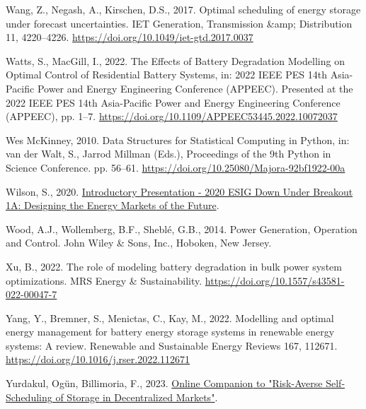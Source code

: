 \documentclass[12pt,a4paper,]{report}
\newlength{\cslhangindent}
\newenvironment{CSLReferences}[2] %
 {%
  \setlength{\parindent}{0pt}
  \ifodd #1 \everypar{\setlength{\hangindent}{\cslhangindent}}\ignorespaces\fi
  \ifnum #2 > 0
  \setlength{\parskip}{#2\baselineskip}
  \fi
 }%
 {}
\begin{document}
\begin{CSLReferences}{1}{0}
\leavevmode{}%
Wang, Z., Negash, A., Kirschen, D.S., 2017. Optimal scheduling of energy
storage under forecast uncertainties. IET Generation, Transmission
\&amp; Distribution 11, 4220--4226.
\url{https://doi.org/10.1049/iet-gtd.2017.0037}

\leavevmode{}%
Watts, S., MacGill, I., 2022. The {Effects} of {Battery Degradation
Modelling} on {Optimal Control} of {Residential Battery Systems}, in:
2022 {IEEE PES} 14th {Asia-Pacific Power} and {Energy Engineering
Conference} ({APPEEC}). Presented at the 2022 {IEEE PES} 14th
{Asia-Pacific Power} and {Energy Engineering Conference} ({APPEEC}), pp.
1--7. \url{https://doi.org/10.1109/APPEEC53445.2022.10072037}

\leavevmode{}%
Wes McKinney, 2010. Data {Structures} for {Statistical Computing} in
{Python}, in: van der Walt, S., Jarrod Millman (Eds.), Proceedings of
the 9th {Python} in {Science Conference}. pp. 56--61.
\url{https://doi.org/10.25080/Majora-92bf1922-00a}

\leavevmode{}%
Wilson, S., 2020.
\href{https://www.youtube.com/watch?v=LpYnKVC9hGY&feature=youtu.be}{Introductory
{Presentation} - 2020 {ESIG Down Under Breakout 1A}: {Designing} the
{Energy Markets} of the {Future}}.

\leavevmode{}%
Wood, A.J., Wollemberg, B.F., Sheblé, G.B., 2014. Power {Generation},
{Operation} and {Control}. {John Wiley \& Sons, Inc.}, {Hoboken, New
Jersey}.

\leavevmode{}%
Xu, B., 2022. The role of modeling battery degradation in bulk power
system optimizations. MRS Energy \& Sustainability.
\url{https://doi.org/10.1557/s43581-022-00047-7}

\leavevmode{}%
Yang, Y., Bremner, S., Menictas, C., Kay, M., 2022. Modelling and
optimal energy management for battery energy storage systems in
renewable energy systems: {A} review. Renewable and Sustainable Energy
Reviews 167, 112671. \url{https://doi.org/10.1016/j.rser.2022.112671}

\leavevmode{}%
Yurdakul, Ogün, Billimoria, F., 2023.
\href{https://github.com/oyurdakul/pesgm23}{Online {Companion} to
"{Risk-Averse Self-Scheduling} of {Storage} in {Decentralized
Markets}"}.


\end{CSLReferences}
\end{document}
